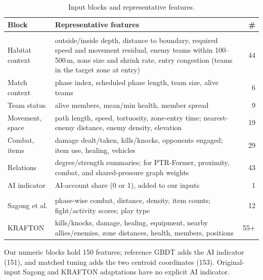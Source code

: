 \documentclass[sigconf,anonymous,nonacm]{acmart}
\begin{document}
\begin{table}[t]
\centering
\caption{Input blocks and representative features.}
\label{tab:blocks}
\footnotesize
\setlength{\tabcolsep}{3pt}
\begin{tabular}{>{\raggedright\arraybackslash}p{1.45cm}p{5.8cm}r}
\hline
Block & Representative features & \# \\
\hline
\multicolumn{3}{l}{\emph{Our inputs}} \\
Habitat context & outside/inside depth, distance to boundary, required speed and movement residual, enemy teams within 100--500\,m, zone size and shrink rate, entry congestion (teams in the target zone at entry) & 44 \\
Match context & phase index, scheduled phase length, team size, alive teams & 6 \\
Team status & alive members, mean/min health, member spread & 9 \\
Movement, space & path length, speed, tortuosity, zone-entry time; nearest-enemy distance, enemy density, elevation & 19 \\
Combat, items & damage dealt/taken, kills/knocks, opponents engaged; item use, healing, vehicles & 29 \\
Relations & degree/strength summaries; for PTR-Former, proximity, combat, and shared-pressure graph weights & 43 \\
AI indicator & AI-account share (0 or 1), added to our inputs & 1 \\
\hline
\multicolumn{3}{l}{\emph{Prior designs}} \\
Sagong et al. & phase-wise combat, distance, density, item counts; fight/activity scores; play type & 12 \\
KRAFTON & kills/knocks, damage, healing, equipment, nearby allies/enemies, zone distances, health, members, positions & 55+ \\
\hline
\end{tabular}
\smallskip
\parbox{\columnwidth}{\scriptsize Our numeric blocks hold 150 features; reference GBDT adds the AI indicator (151), and matched tuning adds the two centroid coordinates (153). Original-input Sagong and KRAFTON adaptations have no explicit AI indicator.}
\end{table}
\end{document}
